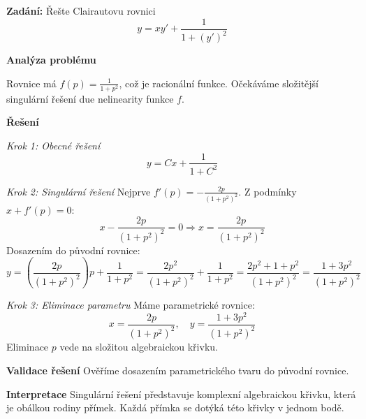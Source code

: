 \begin{example}
\label{ex:racionalni-clairaut}

\noindent\textbf{Zadání:} Řešte Clairautovu rovnici
\[
y = xy' + \frac{1}{1 + (y')^2}
\]

\vspace{1.5\baselineskip}

\noindent\textbf{Analýza problému}

Rovnice má $f(p) = \frac{1}{1 + p^2}$, což je racionální funkce. Očekáváme složitější singulární řešení due nelinearity funkce $f$.

\vspace{1.5\baselineskip}

\noindent\textbf{Řešení}

\noindent\textit{Krok 1: Obecné řešení}
\[
y = Cx + \frac{1}{1 + C^2}
\]

\vspace{1\baselineskip}

\noindent\textit{Krok 2: Singulární řešení}
Nejprve $f'(p) = -\frac{2p}{(1 + p^2)^2}$. Z podmínky $x + f'(p) = 0$:
\[
x - \frac{2p}{(1 + p^2)^2} = 0 \Rightarrow x = \frac{2p}{(1 + p^2)^2}
\]
Dosazením do původní rovnice:
\[
y = \left(\frac{2p}{(1 + p^2)^2}\right)p + \frac{1}{1 + p^2} = \frac{2p^2}{(1 + p^2)^2} + \frac{1}{1 + p^2}
= \frac{2p^2 + 1 + p^2}{(1 + p^2)^2} = \frac{1 + 3p^2}{(1 + p^2)^2}
\]

\vspace{1\baselineskip}

\noindent\textit{Krok 3: Eliminace parametru}
Máme parametrické rovnice:
\[
x = \frac{2p}{(1 + p^2)^2}, \quad y = \frac{1 + 3p^2}{(1 + p^2)^2}
\]
Eliminace $p$ vede na složitou algebraickou křivku.

\vspace{1.5\baselineskip}

\noindent\textbf{Validace řešení}
Ověříme dosazením parametrického tvaru do původní rovnice.

\vspace{1.5\baselineskip}

\noindent\textbf{Interpretace}
Singulární řešení představuje komplexní algebraickou křivku, která je obálkou rodiny přímek. Každá přímka se dotýká této křivky v jednom bodě.

\end{example}

